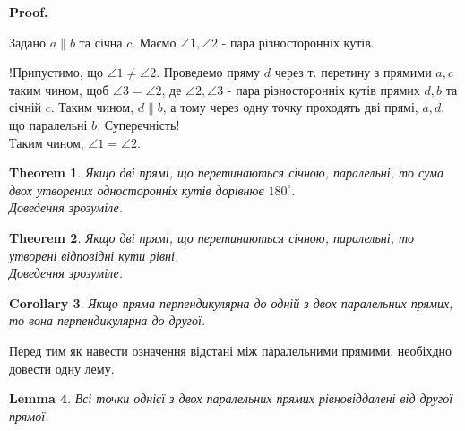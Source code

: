 \documentclass[a4paper, 10pt]{article}
\makeatletter
\def\qed{$\blacksquare$}
\theoremstyle{theoremdd}
\newtheorem{theorem}{Theorem}[subsection]
\theoremstyle{theoremdd}
\theoremstyle{theoremdd}
\theoremstyle{theoremdd}
\theoremstyle{theoremdd}
\theoremstyle{theoremdd}
\theoremstyle{theoremdd}
\theoremstyle{theoremdd}
\newtheorem{lemma}[theorem]{Lemma}
\theoremstyle{theoremdd}
\newtheorem{corollary}[theorem]{Corollary}
\renewenvironment{proof}[1][Proof.\\]{\par
\pushQED{\hfill \qed}%
\normalfont \topsep6\p@\@plus6\p@\relax
\trivlist
\item\relax
{\bfseries
#1\@addpunct{.}}\hspace\labelsep\ignorespaces
}{%
\popQED\endtrivlist\@endpefalse
}
\makeatother
\begin{document}
\begin{proof}
Задано $a \parallel b$ та січна $c$. Маємо $\angle 1, \angle 2$ - пара різносторонніх кутів.
\begin{figure}[H]
\centering
{}
\end{figure}
!Припустимо, що $\angle 1 \neq \angle 2$. Проведемо пряму $d$ через т. перетину з прямими $a,c$ таким чином, щоб $\angle 3 = \angle 2$, де $\angle 2, \angle 3$ - пара різносторонніх кутів прямих $d,b$ та січній $c$. Таким чином, $d \parallel b$, а тому через одну точку проходять дві прямі, $a,d$, що паралельні $b$. Суперечність!\\
Таким чином, $\angle 1 = \angle 2$.
\end{proof}

\begin{theorem}
Якщо дві прямі, що перетинаються січною, паралельні, то сума двох утворених односторонніх кутів дорівнює $180^\circ$.\\
\textit{Доведення зрозуміле.}
\end{theorem}

\begin{theorem}
Якщо дві прямі, що перетинаються січною, паралельні, то утворені відповідні кути рівні.\\
\textit{Доведення зрозуміле.}
\end{theorem}

\begin{corollary}
Якщо пряма перпендикулярна до одній з двох паралельних прямих, то вона перпендикулярна до другої.
\end{corollary}

Перед тим як навести означення відстані між паралельними прямими, необіхдно довести одну лему.
\begin{lemma}
Всі точки однієї з двох паралельних прямих рівновіддалені від другої прямої.
\end{lemma}
\end{document}
